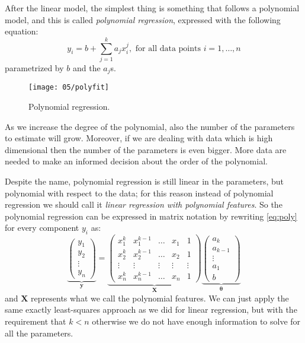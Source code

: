 
After the linear model, the simplest thing is something that follows a polynomial model, and this is called \emph{polynomial regression}, expressed with the following equation:
\begin{equation}\label{eq:poly}
	y_i = b + \sum_{j=1}^{k}a_jx_i^j, \text{ for all data points } i=1, \dots, n
\end{equation}
parametrized by $b$ and the $a_j$s.

\begin{figure}[H]
	\centering
	\texttt{[image: 05/polyfit]}
	\caption{Polynomial regression.}\label{fig:poly_regr}	
\end{figure}

As we increase the degree of the polynomial, also the number of the parameters to estimate will grow. Moreover, if we are dealing with data which is high dimensional then the number of the parameters is even bigger.
More data are needed to make an informed decision about the order of the polynomial.

Despite the name, polynomial regression is still linear in the parameters, but polynomial with respect to the data; for this reason instead of polynomial regression we should call it \emph{linear regression with polynomial features}. So the polynomial regression can be expressed in matrix notation by rewriting \cref{eq:poly} for every component $y_i$ as:
\begin{equation}
	\underbrace{\begin{pmatrix} y_1  \\ y_2  \\ \vdots  \\ y_n \end{pmatrix}}_\mathbf{y} = \underbrace{\begin{pmatrix} x_1^k & x_1^{k-1} & \dots & x_1 & 1 \\ x_2^k & x_2^{k-1} & \dots & x_2 & 1 \\ \vdots & \vdots & \vdots & \vdots & \vdots \\ x_n^k & x_n^{k-1} & \dots & x_n & 1 \end{pmatrix}}_\mathbf{X}  \underbrace{\begin{pmatrix} a_k \\ a_{k-1} \\ \vdots \\ a_1 \\ b \end{pmatrix}}_{\bm{\theta}}
\end{equation}
and $\mathbf{X}$ represents what we call the polynomial features.
We can just apply the same exactly least-squares approach as we did for linear regression, but with the requirement that $k < n$ otherwise we do not have enough information to solve for all the parameters.
